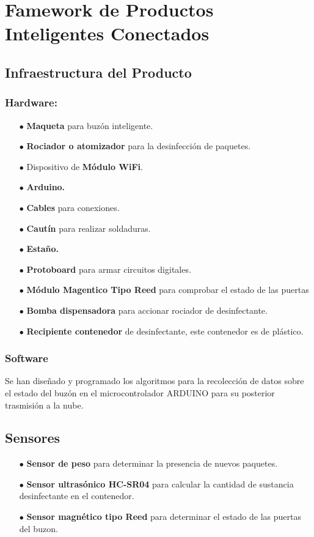 \documentclass[osajnl,twocolumn,showpacs,superscriptaddress,10pt]{revtex4-1}
\begin{document}
\section{Famework de Productos Inteligentes Conectados}
\subsection{Infraestructura del Producto}
\subsubsection{Hardware:}
\begin{itemize}
    \item[$\bullet$]\textbf{Maqueta} para buzón inteligente.
    \item[$\bullet$]\textbf{Rociador o atomizador} para la desinfección de paquetes.
    \item[$\bullet$]Dispositivo de \textbf{Módulo WiFi}.
    \item[$\bullet$]\textbf{Arduino.}
    \item[$\bullet$]\textbf{Cables} para conexiones.
    \item[$\bullet$]\textbf{Cautín} para realizar soldaduras.
    \item[$\bullet$]\textbf{Estaño.}
    \item[$\bullet$]\textbf{Protoboard} para armar circuitos digitales.
    \item[$\bullet$]\textbf{Módulo Magentico Tipo Reed} para comprobar el estado de las puertas
    \item[$\bullet$]\textbf{Bomba dispensadora} para accionar rociador de desinfectante.
    \item[$\bullet$]\textbf{Recipiente contenedor} de desinfectante, este contenedor es de plástico.
\end{itemize}
\subsubsection{Software}
    Se han diseñado y programado los algoritmos para la recolección de datos sobre el estado del buzón en el microcontrolador ARDUINO para su posterior trasmisión a la nube.
    
\subsection{Sensores}
\begin{itemize}
    \item[$\bullet$]\textbf{Sensor de peso} para determinar la presencia de nuevos paquetes.
    \item[$\bullet$]\textbf{Sensor ultrasónico HC-SR04} para calcular la cantidad de sustancia desinfectante en el contenedor.
    \item[$\bullet$]\textbf{Sensor magnético tipo Reed} para determinar el estado de las puertas del buzon.
\end{itemize}
\end{document}
